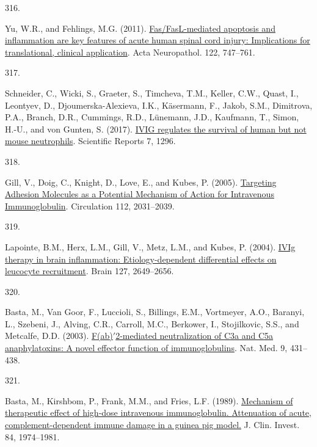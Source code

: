 \documentclass[
]{article}
\newlength{\cslhangindent}
\newlength{\csllabelwidth}
\newlength{\cslentryspacingunit} %
\newenvironment{CSLReferences}[2] %
 {%
  \setlength{\parindent}{0pt}
  \ifodd #1
  \let\oldpar\par
  \def\par{\hangindent=\cslhangindent\oldpar}
  \fi
  \setlength{\parskip}{#2\cslentryspacingunit}
 }%
 {}
\newcommand{\CSLLeftMargin}[1]{\parbox[t]{\csllabelwidth}{#1}}
\newcommand{\CSLRightInline}[1]{\parbox[t]{\linewidth - \csllabelwidth}{#1}\break}
\begin{document}
\begin{CSLReferences}{0}{0}
\leavevmode{}%
\CSLLeftMargin{316. }
\CSLRightInline{Yu, W.R., and Fehlings, M.G. (2011). \href{https://doi.org/10.1007/s00401-011-0882-3}{Fas/{FasL-mediated} apoptosis and inflammation are key features of acute human spinal cord injury: Implications for translational, clinical application}. Acta Neuropathol. 122, 747--761.}

\leavevmode{}%
\CSLLeftMargin{317. }
\CSLRightInline{Schneider, C., Wicki, S., Graeter, S., Timcheva, T.M., Keller, C.W., Quast, I., Leontyev, D., Djoumerska-Alexieva, I.K., Käsermann, F., Jakob, S.M., Dimitrova, P.A., Branch, D.R., Cummings, R.D., Lünemann, J.D., Kaufmann, T., Simon, H.-U., and von Gunten, S. (2017). \href{https://doi.org/10.1038/s41598-017-01404-0}{{IVIG} regulates the survival of human but not mouse neutrophils}. Scientific Reports 7, 1296.}

\leavevmode{}%
\CSLLeftMargin{318. }
\CSLRightInline{Gill, V., Doig, C., Knight, D., Love, E., and Kubes, P. (2005). \href{https://doi.org/10.1161/CIRCULATIONAHA.105.546150}{Targeting {Adhesion Molecules} as a {Potential Mechanism} of {Action} for {Intravenous Immunoglobulin}}. Circulation 112, 2031--2039.}

\leavevmode{}%
\CSLLeftMargin{319. }
\CSLRightInline{Lapointe, B.M., Herx, L.M., Gill, V., Metz, L.M., and Kubes, P. (2004). \href{https://doi.org/10.1093/brain/awh297}{{IVIg} therapy in brain inflammation: Etiology-dependent differential effects on leucocyte recruitment}. Brain 127, 2649--2656.}

\leavevmode{}%
\CSLLeftMargin{320. }
\CSLRightInline{Basta, M., Van Goor, F., Luccioli, S., Billings, E.M., Vortmeyer, A.O., Baranyi, L., Szebeni, J., Alving, C.R., Carroll, M.C., Berkower, I., Stojilkovic, S.S., and Metcalfe, D.D. (2003). \href{https://doi.org/10.1038/nm836}{F(ab){\({'}\)}2-mediated neutralization of {C3a} and {C5a} anaphylatoxins: A novel effector function of immunoglobulins}. Nat. Med. 9, 431--438.}

\leavevmode{}%
\CSLLeftMargin{321. }
\CSLRightInline{Basta, M., Kirshbom, P., Frank, M.M., and Fries, L.F. (1989). \href{https://doi.org/10.1172/JCI114387}{Mechanism of therapeutic effect of high-dose intravenous immunoglobulin. {Attenuation} of acute, complement-dependent immune damage in a guinea pig model.} J. Clin. Invest. 84, 1974--1981.}


\end{CSLReferences}
\end{document}
